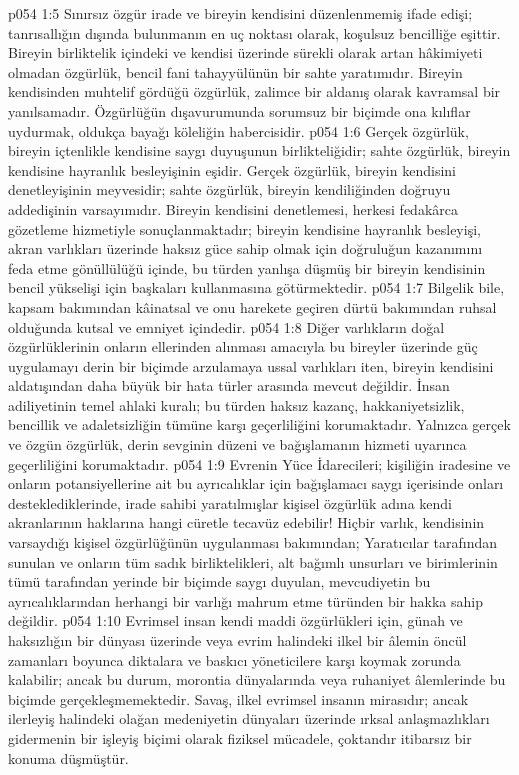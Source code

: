 \vs p054 1:5 Sınırsız özgür irade ve bireyin kendisini düzenlenmemiş ifade edişi; tanrısallığın dışında bulunmanın en uç noktası olarak, koşulsuz bencilliğe eşittir. Bireyin birliktelik içindeki ve kendisi üzerinde sürekli olarak artan hâkimiyeti olmadan özgürlük, bencil fani tahayyülünün bir sahte yaratımıdır. Bireyin kendisinden muhtelif gördüğü özgürlük, zalimce bir aldanış olarak kavramsal bir yanılsamadır. Özgürlüğün dışavurumunda sorumsuz bir biçimde ona kılıflar uydurmak, oldukça bayağı köleliğin habercisidir.
\vs p054 1:6 Gerçek özgürlük, bireyin içtenlikle kendisine saygı duyuşunun birlikteliğidir; sahte özgürlük, bireyin kendisine hayranlık besleyişinin eşidir. Gerçek özgürlük, bireyin kendisini denetleyişinin meyvesidir; sahte özgürlük, bireyin kendiliğinden doğruyu addedişinin varsayımıdır. Bireyin kendisini denetlemesi, herkesi fedakârca gözetleme hizmetiyle sonuçlanmaktadır; bireyin kendisine hayranlık besleyişi, akran varlıkları üzerinde haksız güce sahip olmak için doğruluğun kazanımını feda etme gönüllülüğü içinde, bu türden yanlışa düşmüş bir bireyin kendisinin bencil yükselişi için başkaları kullanmasına götürmektedir.
\vs p054 1:7 Bilgelik bile, kapsam bakımından kâinatsal ve onu harekete geçiren dürtü bakımından ruhsal olduğunda kutsal ve emniyet içindedir.
\vs p054 1:8 Diğer varlıkların doğal özgürlüklerinin onların ellerinden alınması amacıyla bu bireyler üzerinde güç uygulamayı derin bir biçimde arzulamaya ussal varlıkları iten, bireyin kendisini aldatışından daha büyük bir hata türler arasında mevcut değildir. İnsan adiliyetinin temel ahlaki kuralı; bu türden haksız kazanç, hakkaniyetsizlik, bencillik ve adaletsizliğin tümüne karşı geçerliliğini korumaktadır. Yalnızca gerçek ve özgün özgürlük, derin sevginin düzeni ve bağışlamanın hizmeti uyarınca geçerliliğini korumaktadır.
\vs p054 1:9 Evrenin Yüce İdarecileri; kişiliğin iradesine ve onların potansiyellerine ait bu ayrıcalıklar için bağışlamacı saygı içerisinde onları desteklediklerinde, irade sahibi yaratılmışlar kişisel özgürlük adına kendi akranlarının haklarına hangi cüretle tecavüz edebilir! Hiçbir varlık, kendisinin varsaydığı kişisel özgürlüğünün uygulanması bakımından; Yaratıcılar tarafından sunulan ve onların tüm sadık birliktelikleri, alt bağımlı unsurları ve birimlerinin tümü tarafından yerinde bir biçimde saygı duyulan, mevcudiyetin bu ayrıcalıklarından herhangi bir varlığı mahrum etme türünden bir hakka sahip değildir.
\vs p054 1:10 Evrimsel insan kendi maddi özgürlükleri için, günah ve haksızlığın bir dünyası üzerinde veya evrim halindeki ilkel bir âlemin öncül zamanları boyunca diktalara ve baskıcı yöneticilere karşı koymak zorunda kalabilir; ancak bu durum, morontia dünyalarında veya ruhaniyet âlemlerinde bu biçimde gerçekleşmemektedir. Savaş, ilkel evrimsel insanın mirasıdır; ancak ilerleyiş halindeki olağan medeniyetin dünyaları üzerinde ırksal anlaşmazlıkları gidermenin bir işleyiş biçimi olarak fiziksel mücadele, çoktandır itibarsız bir konuma düşmüştür.
